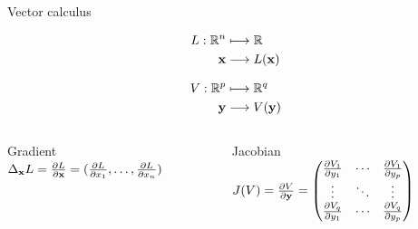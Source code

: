 \documentclass[xcolor=pdftex,dvipsnames,table,mathserif]{beamer}
\begin{document}
\begin{frame}{Vector calculus}

  \begin{equation*}
    \begin{split}
      L: \mathbb{R}^n & \longmapsto \mathbb{R}\\
      \mathbf{x}      & \longrightarrow L(\mathbf{x})
    \end{split}
  \end{equation*}

  \begin{equation*}
    \begin{split}
      V: \mathbb{R}^p & \longmapsto \mathbb{R}^q\\
      \mathbf{y}      & \longrightarrow V(\mathbf{y})
    \end{split}
  \end{equation*}

  \begin{columns}
    \begin{column}{.5\textwidth}
      \begin{block}{Gradient}
        \centering
        $\Delta_{\mathbf{x}} L = \frac{\partial L}{\partial \mathbf{x}} = (\frac{\partial L}{\partial x_1}, \ldots, \frac{\partial L}{\partial x_n}) $
      \end{block}
    \end{column}

    \begin{column}{.5\textwidth}
      \begin{block}{Jacobian}
        \centering
        $J(V) = \frac{\partial V}{\partial \mathbf{y}} =
        \begin{pmatrix}
          \frac{\partial V_1}{\partial y_1} & \cdots & \frac{\partial V_1}{\partial y_p}  \\
          \vdots  & \ddots & \vdots  \\
          \frac{\partial V_q}{\partial y_1} & \cdots & \frac{\partial V_q}{\partial y_p}
        \end{pmatrix}
        $
      \end{block}
    \end{column}
  \end{columns}

\end{frame}
\end{document}
